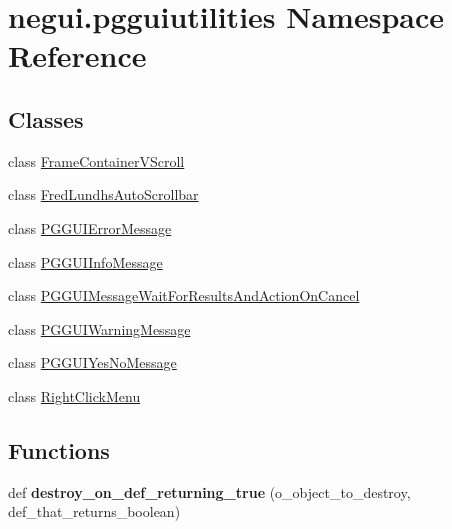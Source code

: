\hypertarget{namespacenegui_1_1pgguiutilities}{}\section{negui.\+pgguiutilities Namespace Reference}
\label{namespacenegui_1_1pgguiutilities}
\subsection*{Classes}
\begin{DoxyCompactItemize}
\item 
class \hyperlink{classnegui_1_1pgguiutilities_1_1FrameContainerVScroll}{Frame\+Container\+V\+Scroll}
\item 
class \hyperlink{classnegui_1_1pgguiutilities_1_1FredLundhsAutoScrollbar}{Fred\+Lundhs\+Auto\+Scrollbar}
\item 
class \hyperlink{classnegui_1_1pgguiutilities_1_1PGGUIErrorMessage}{P\+G\+G\+U\+I\+Error\+Message}
\item 
class \hyperlink{classnegui_1_1pgguiutilities_1_1PGGUIInfoMessage}{P\+G\+G\+U\+I\+Info\+Message}
\item 
class \hyperlink{classnegui_1_1pgguiutilities_1_1PGGUIMessageWaitForResultsAndActionOnCancel}{P\+G\+G\+U\+I\+Message\+Wait\+For\+Results\+And\+Action\+On\+Cancel}
\item 
class \hyperlink{classnegui_1_1pgguiutilities_1_1PGGUIWarningMessage}{P\+G\+G\+U\+I\+Warning\+Message}
\item 
class \hyperlink{classnegui_1_1pgguiutilities_1_1PGGUIYesNoMessage}{P\+G\+G\+U\+I\+Yes\+No\+Message}
\item 
class \hyperlink{classnegui_1_1pgguiutilities_1_1RightClickMenu}{Right\+Click\+Menu}
\end{DoxyCompactItemize}
\subsection*{Functions}
\begin{DoxyCompactItemize}
\item 
def {\bfseries destroy\+\_\+on\+\_\+def\+\_\+returning\+\_\+true} (o\+\_\+object\+\_\+to\+\_\+destroy, def\+\_\+that\+\_\+returns\+\_\+boolean)\hypertarget{namespacenegui_1_1pgguiutilities_a39b66c42d10f1cd4ff1aa1e99fce496a}{}\label{namespacenegui_1_1pgguiutilities_a39b66c42d10f1cd4ff1aa1e99fce496a}

\end{DoxyCompactItemize}
